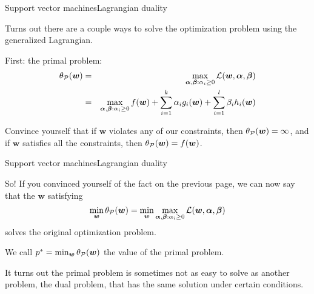 \documentclass{beamer}
\renewcommand{\vec}[1]{\boldsymbol{#1}}
\begin{document}
\begin{frame}{Support vector machines}{Lagrangian duality}

  Turns out there are a couple ways to solve the optimization problem using
  the generalized Lagrangian.

  \medskip

  First: the \alert{primal} problem:
  \begin{eqnarray}
    \theta_{\cal P}(\vec{w}) & = & \max_{\vec{\alpha},\vec{\beta}:\alpha_i \ge 0} {\cal L}(\vec{w},\vec{\alpha},\vec{\beta}) \nonumber\\
    & = & \max_{\vec{\alpha},\vec{\beta}:\alpha_i \ge 0} f(\vec{w}) + \sum_{i=1}^k \alpha_i g_i(\vec{w}) + \sum_{i=1}^l \beta_i h_i(\vec{w}) \nonumber
    \end{eqnarray}

  \medskip

  Convince yourself that if $\vec{w}$ violates any of our constraints,
  then $\theta_{\cal P}(\vec{w}) = \infty$, and if $\vec{w}$ satisfies
  all the constraints, then $\theta_{\cal P}(\vec{w}) = f(\vec{w})$.
  
\end{frame}


\begin{frame}{Support vector machines}{Lagrangian duality}

  So! If you convinced yourself of the fact on the previous page, we can now
  say that the $\vec{w}$ satisfying
  \[ \min_{\vec{w}} \theta_{\cal P}(\vec{w}) = \min_{\vec{w}} \max_{\vec{\alpha},\vec{\beta}:\alpha_i \ge 0} {\cal L}(\vec{w},\vec{\alpha},\vec{\beta}) \]
  solves the original optimization problem.

  \medskip

 We call $p^* = \min_{\vec{w}}\theta_{\cal P}(\vec{w})$ the
 \alert{value of the primal problem}.

  \medskip

  It turns out the primal problem is sometimes not as easy to solve as
  another problem, the \alert{dual} problem, that has the same solution
  under certain conditions.
    
\end{frame}
\end{document}
